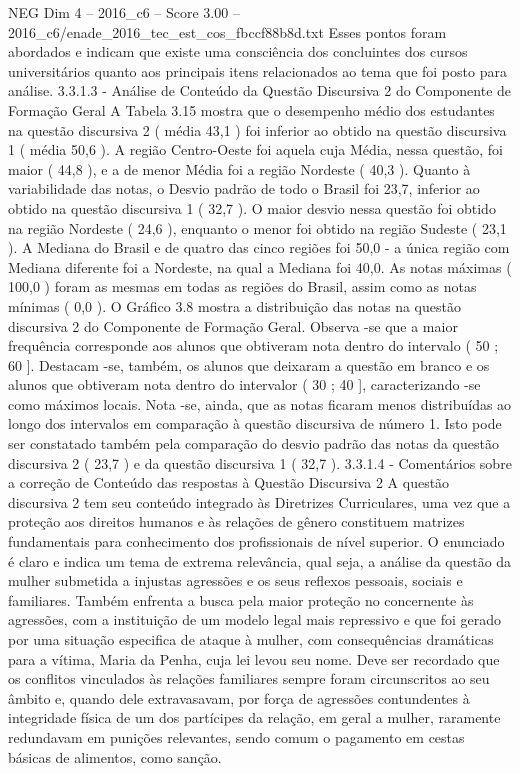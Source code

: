\begin{textsample}{NEG Dim 4 – 2016\_c6 – Score 3.00 – 2016\_c6/enade\_2016\_tec\_est\_cos\_fbccf88b8d.txt}
Esses pontos foram abordados e indicam que existe uma consciência dos concluintes dos cursos universitários quanto aos principais itens relacionados ao tema que foi posto para análise. 3.3.1.3 - Análise de Conteúdo da Questão Discursiva 2 do Componente de Formação Geral A Tabela 3.15 mostra que o desempenho médio dos estudantes na questão discursiva 2 ( média 43,1 ) foi inferior ao obtido na questão discursiva 1 ( média 50,6 ).
A região Centro-Oeste foi aquela cuja Média, nessa questão, foi maior ( 44,8 ), e a de menor Média foi a região Nordeste ( 40,3 ).
Quanto à variabilidade das notas, o Desvio padrão de todo o Brasil foi 23,7, inferior ao obtido na questão discursiva 1 ( 32,7 ).
O maior desvio nessa questão foi obtido na região Nordeste ( 24,6 ), enquanto o menor foi obtido na região Sudeste ( 23,1 ).
A Mediana do Brasil e de quatro das cinco regiões foi 50,0 - a única região com Mediana diferente foi a Nordeste, na qual a Mediana foi 40,0.
As notas máximas ( 100,0 ) foram as mesmas em todas as regiões do Brasil, assim como as notas mínimas ( 0,0 ).
O Gráfico 3.8 mostra a distribuição das notas na questão discursiva 2 do Componente de Formação Geral.
Observa -se que a maior frequência corresponde aos alunos que obtiveram nota dentro do intervalo ( 50 ; 60 ].
Destacam -se, também, os alunos que deixaram a questão em branco e os alunos que obtiveram nota dentro do intervalor ( 30 ; 40 ], caracterizando -se como máximos locais.
Nota -se, ainda, que as notas ficaram menos distribuídas ao longo dos intervalos em comparação à questão discursiva de número 1.
Isto pode ser constatado também pela comparação do desvio padrão das notas da questão discursiva 2 ( 23,7 ) e da questão discursiva 1 ( 32,7 ). 3.3.1.4 - Comentários sobre a correção de Conteúdo das respostas à Questão Discursiva 2 A questão discursiva 2 tem seu conteúdo integrado às Diretrizes Curriculares, uma vez que a proteção aos direitos humanos e às relações de gênero constituem matrizes fundamentais para conhecimento dos profissionais de nível superior.
O enunciado é claro e indica um tema de extrema relevância, qual seja, a análise da questão da mulher submetida a injustas agressões e os seus reflexos pessoais, sociais e familiares.
Também enfrenta a busca pela maior proteção no concernente às agressões, com a instituição de um modelo legal mais repressivo e que foi gerado por uma situação especifica de ataque à mulher, com consequências dramáticas para a vítima, Maria da Penha, cuja lei levou seu nome.
Deve ser recordado que os conflitos vinculados às relações familiares sempre foram circunscritos ao seu âmbito e, quando dele extravasavam, por força de agressões contundentes à integridade física de um dos partícipes da relação, em geral a mulher, raramente redundavam em punições relevantes, sendo comum o pagamento em cestas básicas de alimentos, como sanção.

\end{textsample}
